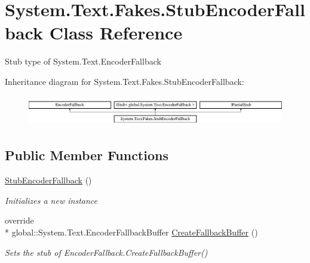 \hypertarget{class_system_1_1_text_1_1_fakes_1_1_stub_encoder_fallback}{\section{System.\-Text.\-Fakes.\-Stub\-Encoder\-Fallback Class Reference}
\label{class_system_1_1_text_1_1_fakes_1_1_stub_encoder_fallback}
}


Stub type of System.\-Text.\-Encoder\-Fallback 


Inheritance diagram for System.\-Text.\-Fakes.\-Stub\-Encoder\-Fallback\-:\begin{figure}[H]
\begin{center}
\leavevmode
\includegraphics[height=1.347774cm]{class_system_1_1_text_1_1_fakes_1_1_stub_encoder_fallback}
\end{center}
\end{figure}
\subsection*{Public Member Functions}
\begin{DoxyCompactItemize}
\item 
\hyperlink{class_system_1_1_text_1_1_fakes_1_1_stub_encoder_fallback_ac3099409256aa40f48dafc9de830ed3b}{Stub\-Encoder\-Fallback} ()
\begin{DoxyCompactList}\small\item\em Initializes a new instance\end{DoxyCompactList}\item 
override \\*
global\-::\-System.\-Text.\-Encoder\-Fallback\-Buffer \hyperlink{class_system_1_1_text_1_1_fakes_1_1_stub_encoder_fallback_a1f289f919aa1fb2bfa422a16b67ab020}{Create\-Fallback\-Buffer} ()
\begin{DoxyCompactList}\small\item\em Sets the stub of Encoder\-Fallback.\-Create\-Fallback\-Buffer()\end{DoxyCompactList}\end{DoxyCompactItemize}
